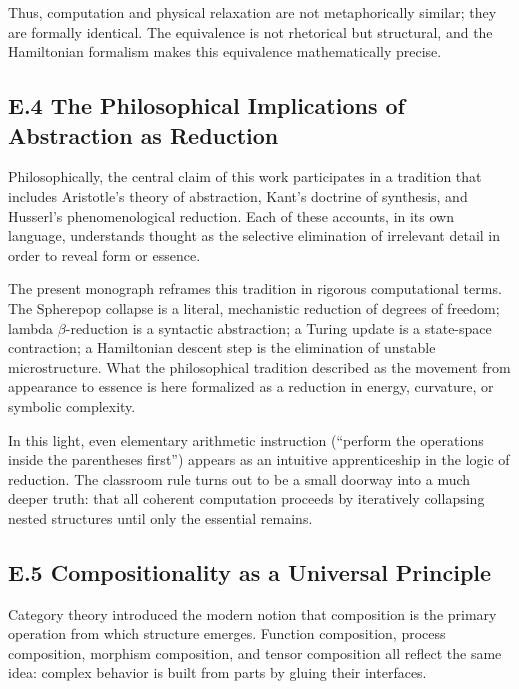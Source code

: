 \documentclass[12pt,letterpaper]{article}
\begin{document}
Thus, computation and physical relaxation are not metaphorically similar; they 
are formally identical.  The equivalence is not rhetorical but structural, and 
the Hamiltonian formalism makes this equivalence mathematically precise.

\subsection*{E.4 The Philosophical Implications of Abstraction as Reduction}

Philosophically, the central claim of this work participates in a tradition that 
includes Aristotle’s theory of abstraction, Kant’s doctrine of synthesis, and 
Husserl’s phenomenological reduction.  Each of these accounts, in its own 
language, understands thought as the selective elimination of irrelevant detail 
in order to reveal form or essence.

The present monograph reframes this tradition in rigorous computational terms.  
The Spherepop collapse is a literal, mechanistic reduction of degrees of 
freedom; lambda $\beta$-reduction is a syntactic abstraction; a Turing update is 
a state-space contraction; a Hamiltonian descent step is the elimination of 
unstable microstructure.  What the philosophical tradition described as the 
movement from appearance to essence is here formalized as a reduction in 
energy, curvature, or symbolic complexity.

In this light, even elementary arithmetic instruction (``perform the operations 
inside the parentheses first'') appears as an intuitive apprenticeship in the 
logic of reduction.  The classroom rule turns out to be a small doorway into a 
much deeper truth: that all coherent computation proceeds by iteratively 
collapsing nested structures until only the essential remains.

\subsection*{E.5 Compositionality as a Universal Principle}

Category theory introduced the modern notion that composition is the primary 
operation from which structure emerges.  Function composition, process 
composition, morphism composition, and tensor composition all reflect the same 
idea: complex behavior is built from parts by gluing their interfaces.
\end{document}
